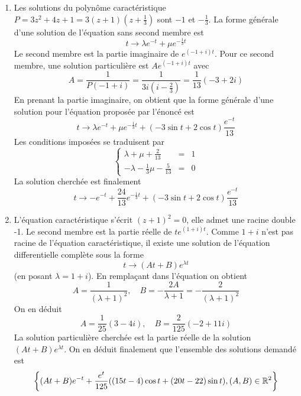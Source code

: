 \begin{enumerate}
\item Les solutions du polynôme caractéristique $P=3z^2+4z+1=3(z+1)(z+\frac{1}{3})$ sont $-1$ et $-\frac{1}{3}$. La forme générale d'une solution de l'équation sans second membre est
\[t\rightarrow \lambda e^{-t} + \mu e^{-\frac{1}{3}t}\]
Le second membre est la partie imaginaire de $e^{(-1+i)t}$. Pour ce second membre, une solution particulière est $Ae^{(-1+i)t}$ avec
\[A=\frac{1}{P(-1+i)}=\frac{1}{3i(i-\frac{2}{3})}=\frac{1}{13}(-3+2i)\]
En prenant la partie imaginaire, on obtient que la forme générale d'une solution pour l'équation proposée par l'énoncé est
\[t\rightarrow \lambda e^{-t} + \mu e^{-\frac{1}{3}t}+(-3\sin t + 2\cos t)\frac{e^{-t}}{13}\]
Les conditions imposées se traduisent par
\[\left\lbrace
\begin{array}{ccc}
\lambda + \mu + \frac{2}{13}&=& 1  \\
-\lambda -\frac{1}{3}\mu -\frac{5}{13}&=& 0
\end{array}
\right. \]
La solution cherchée est finalement
\[t\rightarrow -e^{-t} +\frac{24}{13} e^{-\frac{1}{3}t} + (-3\sin t + 2\cos t)\frac{e^{-t}}{13}\]
\item L'équation caractéristique s'écrit $(z+1)^2=0$, elle admet une racine double -1. Le second membre est la partie réelle de $te^{(1+i)t}$. Comme $1+i$ n'est pas racine de l'équation caractéristique, il existe une solution de l'équation differentielle complète sous la forme
\[t \rightarrow (At+B)e^{\lambda t}\]
(en posant $\lambda = 1+i$). En remplaçant dans l'équation on obtient
\[A=\frac{1}{(\lambda+1)^2},\quad B=-\frac{2A}{\lambda+1}=-\frac{2}{(\lambda+1)^2}\]
On en déduit
\[A=\frac{1}{25}(3-4i),\quad B=\frac{2}{125}(-2+11i)\]
La solution particulière cherchée est la partie réelle de la solution $(At+B)e^{\lambda t}$. On en déduit finalement que l'ensemble des solutions demandé est
\[\left\lbrace (At+B)e^{- t}+\frac{e^t}{125}((15t-4)\cos t +(20t-22)\sin t  ) , (A,B)\in \mathbb{R}^2\right\rbrace \]
\end{enumerate}
